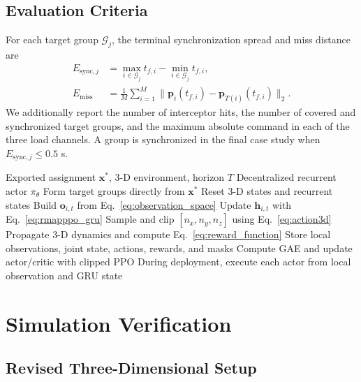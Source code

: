 \documentclass[lettersize,journal]{IEEEtran}
\begin{document}
{\subsection{Evaluation Criteria}
\label{subsec:eval}

For each target group \(\mathcal G_j\), the terminal synchronization spread and
miss distance are
\begin{align}
E_{\mathrm{sync},j}&=\max_{i\in\mathcal G_j}t_{f,i}
-\min_{i\in\mathcal G_j}t_{f,i},\\
E_{\mathrm{miss}}&=\frac{1}{M}\sum_{i=1}^{M}
\|\mathbf p_i(t_{f,i})-\mathbf p_{T(i)}(t_{f,i})\|_2 .
\end{align}
We additionally report the number of interceptor hits, the number of covered and
synchronized target groups, and the maximum absolute command in each of the
three load channels. A group is synchronized in the final case study when
\(E_{\mathrm{sync},j}\le0.5\) s.

\begin{algorithm}[!t]
\caption{R-MAPPO Cooperative Interception Guidance}
\label{alg:r_mappo}
\footnotesize
\begin{algorithmic}[1]
\REQUIRE Exported assignment \(\mathbf{x}^{*}\), 3-D environment, horizon \(T\)
\ENSURE Decentralized recurrent actor \(\pi_\theta\)
\STATE Form target groups directly from \(\mathbf{x}^{*}\)
    \STATE Reset 3-D states and recurrent states
            \STATE Build \(\mathbf{o}_{i,t}\) from Eq.~\eqref{eq:observation_space}
            \STATE Update \(\mathbf{h}_{i,t}\) with Eq.~\eqref{eq:rmapppo_gru}
            \STATE Sample and clip \([n_x,n_y,n_z]\) using Eq.~\eqref{eq:action3d}
        \ENDFOR
        \STATE Propagate 3-D dynamics and compute Eq.~\eqref{eq:reward_function}
        \STATE Store local observations, joint state, actions, rewards, and masks
    \ENDFOR
    \STATE Compute GAE and update actor/critic with clipped PPO
\ENDFOR
\STATE During deployment, execute each actor from local observation and GRU state
\end{algorithmic}
\end{algorithm}


\section{Simulation Verification}
\label{sec:simulation}

\subsection{Revised Three-Dimensional Setup}
\label{subsec:setup}

}
\end{document}
